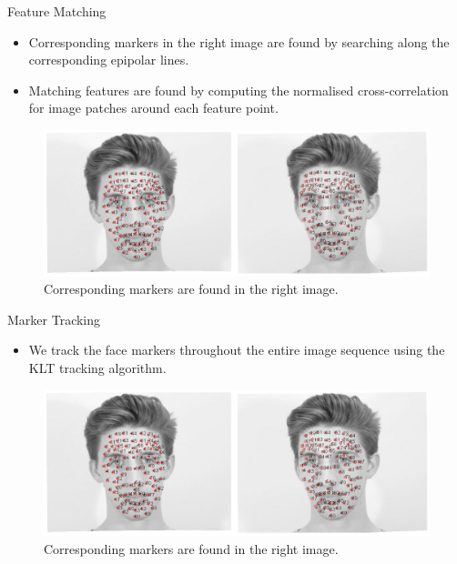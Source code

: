 \documentclass{beamer}
\begin{document}
\begin{frame}{Feature Matching}

\begin{itemize}
\setlength\itemsep{0.5em}
\item Corresponding markers in the right image are found by searching along the corresponding epipolar lines.
\item Matching features are found by computing the normalised cross-correlation for image patches around each feature point.
\end{itemize}

\begin{center}
\begin{figure}
\includegraphics[width=1.0\textwidth]{img/matching}
\caption{\tiny{Corresponding markers are found in the right image.}}
\end{figure}
\end{center}

\end{frame}



\begin{frame}{Marker Tracking}

\begin{itemize}
\setlength\itemsep{0.5em}
\item We track the face markers throughout the entire image sequence using the KLT tracking algorithm.
\end{itemize}

\begin{center}
\begin{figure}
\includegraphics[width=1.0\textwidth]{img/matching}
\caption{\tiny{Corresponding markers are found in the right image.}}
\end{figure}
\end{center}

\end{frame}
\end{document}
